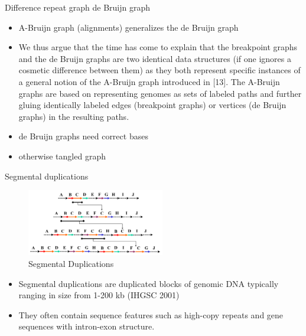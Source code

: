 \documentclass{beamer}
\begin{document}
  \begin{frame}{Difference repeat graph de Bruijn graph}
    \begin{itemize}[<+- | alert@+>]
      \item A-Bruijn graph (alignments) generalizes the de Bruijn graph

      \item We thus argue that the time has come to explain that the breakpoint graphs and the de Bruijn graphs are two identical data structures (if one ignores a cosmetic difference between them) as they both represent specific instances of a general notion of the A-Bruijn graph introduced in [13]. The A-Bruijn graphs are based on representing genomes as sets of labeled paths and further gluing identically labeled edges (breakpoint graphs) or vertices (de Bruijn graphs) in the resulting paths.

      \item de Bruijn graphs need correct bases
      
      \item otherwise tangled graph
    \end{itemize}
  \end{frame}

  \begin{frame}{Segmental duplications}
    \begin{figure}
      \includegraphics[width=6cm]{images/SDs.png}
      \caption{Segmental Duplications}
      \label{fig:SD}
    \end{figure}
    \begin{itemize}[<+- | alert@+>]
      \item Segmental duplications are duplicated blocks of genomic DNA typically ranging in size from 1-200 kb (IHGSC 2001)

      \item They often contain sequence features such as high-copy repeats and gene sequences with intron-exon structure. 
    \end{itemize}
  \end{frame}
\end{document}
